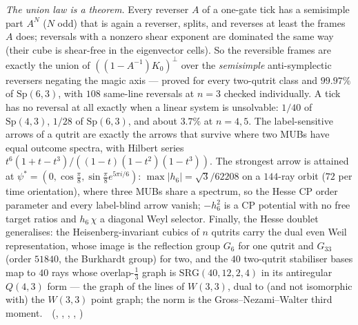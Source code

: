 \emph{The union law is a theorem.} Every reverser $A$ of a one-gate tick has a semisimple part $A^N$ ($N$ odd) that is again a
reverser, splits, and reverses at least the frames $A$ does; reversals with a nonzero shear exponent are dominated the same way (their
cube is shear-free in the eigenvector cells). So the reversible frames are exactly the union of $((1-A^{-1})K_0)^\perp$ over the
\emph{semisimple} anti-symplectic reversers negating the magic axis --- proved for every two-qutrit class and $99.97\%$ of
$\mathrm{Sp}(6,3)$, with $108$ same-line reversals at $n=3$ checked individually. A tick has no reversal at all exactly when a linear
system is unsolvable: $1/40$ of $\mathrm{Sp}(4,3)$, $1/28$ of $\mathrm{Sp}(6,3)$, and about $3.7\%$ at $n=4,5$. The label-sensitive
arrows of a qutrit are exactly the arrows that survive where two MUBs have equal outcome spectra, with Hilbert series
$t^6(1+t-t^3)/((1-t)(1-t^2)(1-t^3))$. The strongest arrow is attained at $\psi^*=(0,\cos\frac\pi8,\sin\frac\pi8e^{5\pi i/6})$: $\max|h_6|=\sqrt3/62208$
on a $144$-ray orbit ($72$ per time orientation), where three MUBs share a spectrum, so the Hesse CP order parameter and every
label-blind arrow vanish; $-h_6^2$ is a CP potential with no free target ratios and $h_6\,\chi$ a diagonal Weyl selector. Finally, the
Hesse doublet generalises: the Heisenberg-invariant cubics of $n$ qutrits carry the dual even Weil representation, whose image is the
reflection group $G_6$ for one qutrit and $G_{33}$ (order $51840$, the Burkhardt group) for two, and the $40$ two-qutrit stabiliser bases
map to $40$ rays whose overlap-$\frac13$ graph is $\mathrm{SRG}(40,12,2,4)$ in its antiregular $Q(4,3)$ form --- the graph of the lines of $W(3,3)$, dual to (and not isomorphic with) the $W(3,3)$ point graph; the norm is the Gross--Nezami--Walter third moment.
\tierT\,\tierC\ (, ,
, ,
)

